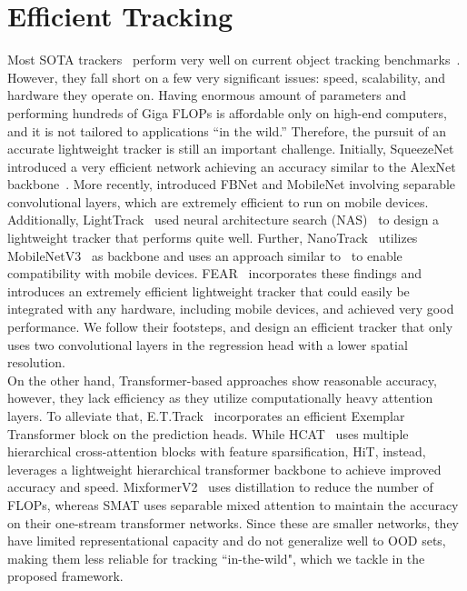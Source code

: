 \section{Efficient Tracking}
Most SOTA trackers~\cite{gao2022aiatrack,he2023target,yan2021learning,wei2023autoregressive,chen2023seqtrack} perform very well on current object tracking benchmarks~\cite{Huang2021,fan2021lasot, kiani2017need, muller2018trackingnet, 7001050, mueller2016benchmark}. However, they fall short on a few very significant issues: speed, scalability, and hardware they operate on. Having enormous amount of parameters and performing hundreds of Giga FLOPs is affordable only on high-end computers, and it is not tailored to applications ``in the wild.'' Therefore, the pursuit of an accurate lightweight tracker is still an important challenge. Initially, SqueezeNet~\cite{iandola2016squeezenet} introduced a very efficient network achieving an accuracy similar to the AlexNet backbone~\cite{krizhevsky2012imagenet}. More recently, \cite{wan2020fbnetv2, howard2019searching} introduced FBNet and MobileNet involving separable convolutional layers, which are extremely efficient to run on mobile devices. Additionally, LightTrack~\cite{yan2021lighttrack} used neural architecture search (NAS)~\cite{pham2018efficient} to design a lightweight tracker that  performs quite well. Further, NanoTrack~\cite{githubGitHubHonglinChuNanoTrack} utilizes MobileNetV3~\cite{howard2019searching} as backbone and uses an approach similar to~\cite{chen2020siamese,yan2021lighttrack} to enable compatibility with mobile devices. FEAR~\cite{borsuk2022fear} incorporates these findings and introduces an extremely efficient lightweight tracker that could easily be integrated with any hardware, including mobile devices, and achieved very good performance. We follow their footsteps, and design an efficient tracker that only uses two convolutional layers in the regression head with a lower spatial resolution.\\

On the other hand, Transformer-based approaches\cite{gao2022aiatrack, wei2023autoregressive,chen2023seqtrack, yan2021learning} show reasonable accuracy, however, they lack efficiency as they utilize computationally heavy attention layers. 
To alleviate that, E.T.Track~\cite{blatter2023efficient} incorporates an efficient Exemplar Transformer block on the prediction heads. While HCAT~\cite{chen2022efficient} uses multiple hierarchical cross-attention blocks with feature sparsification, HiT\cite{kang2023exploring}, instead, leverages a lightweight hierarchical transformer backbone to achieve improved accuracy and speed. MixformerV2~\cite{cui2024mixformerv2} uses distillation to reduce the number of FLOPs, whereas SMAT \cite{gopal2024separable} uses separable mixed attention to maintain the accuracy on their one-stream transformer networks. Since these are smaller networks, they have limited representational capacity and do not generalize well to OOD sets, making them less reliable for tracking ``in-the-wild", which we tackle in the proposed framework.



